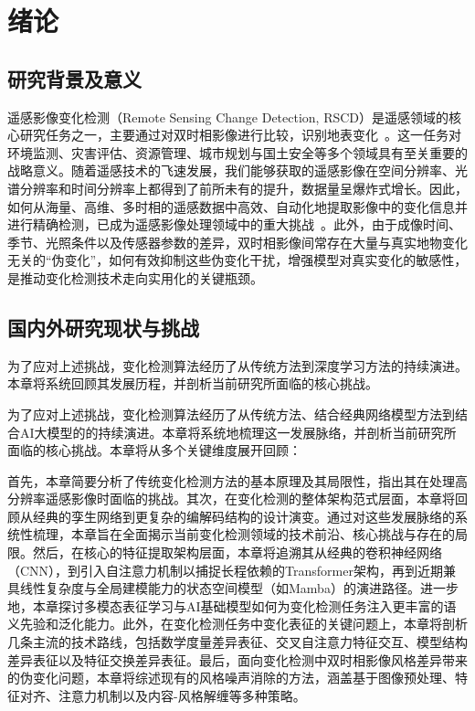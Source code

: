 \chapter{绪论}
\section{研究背景及意义}

遥感影像变化检测（Remote Sensing Change Detection, RSCD）是遥感领域的核心研究任务之一，主要通过对双时相影像进行比较，识别地表变化~\cite{DQXX202004022}。这一任务对环境监测、灾害评估、资源管理、城市规划与国土安全等多个领域具有至关重要的战略意义。随着遥感技术的飞速发展，我们能够获取的遥感影像在空间分辨率、光谱分辨率和时间分辨率上都得到了前所未有的提升，数据量呈爆炸式增长。因此，如何从海量、高维、多时相的遥感数据中高效、自动化地提取影像中的变化信息并进行精确检测，已成为遥感影像处理领域中的重大挑战~\cite{CHXB201710028}。此外，由于成像时间、季节、光照条件以及传感器参数的差异，双时相影像间常存在大量与真实地物变化无关的“伪变化”，如何有效抑制这些伪变化干扰，增强模型对真实变化的敏感性，是推动变化检测技术走向实用化的关键瓶颈。

\section{国内外研究现状与挑战}
为了应对上述挑战，变化检测算法经历了从传统方法到深度学习方法的持续演进。本章将系统回顾其发展历程，并剖析当前研究所面临的核心挑战。

为了应对上述挑战，变化检测算法经历了从传统方法、结合经典网络模型方法到结合AI大模型的的持续演进。本章将系统地梳理这一发展脉络，并剖析当前研究所面临的核心挑战。本章将从多个关键维度展开回顾：

首先，本章简要分析了传统变化检测方法的基本原理及其局限性，指出其在处理高分辨率遥感影像时面临的挑战。其次，在变化检测的整体架构范式层面，本章将回顾从经典的孪生网络到更复杂的编解码结构的设计演变。通过对这些发展脉络的系统性梳理，本章旨在全面揭示当前变化检测领域的技术前沿、核心挑战与存在的局限。然后，在核心的特征提取架构层面，本章将追溯其从经典的卷积神经网络（CNN），到引入自注意力机制以捕捉长程依赖的Transformer架构，再到近期兼具线性复杂度与全局建模能力的状态空间模型（如Mamba）的演进路径。进一步地，本章探讨多模态表征学习与AI基础模型如何为变化检测任务注入更丰富的语义先验和泛化能力。此外，在变化检测任务中变化表征的关键问题上，本章将剖析几条主流的技术路线，包括数学度量差异表征、交叉自注意力特征交互、模型结构差异表征以及特征交换差异表征。最后，面向变化检测中双时相影像风格差异带来的伪变化问题，本章将综述现有的风格噪声消除的方法，涵盖基于图像预处理、特征对齐、注意力机制以及内容-风格解缠等多种策略。

